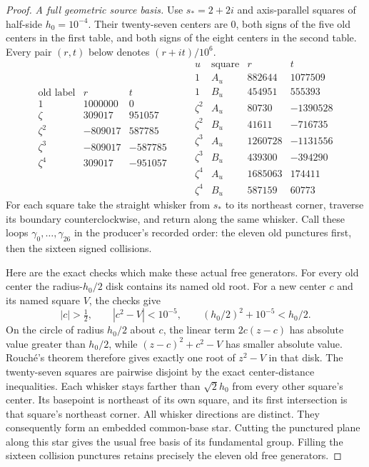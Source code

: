 \begin{proof}
\emph{A full geometric source basis.}
Use $s_*=2+2i$ and axis-parallel squares of half-side
$h_0=10^{-4}$. Their twenty-seven centers are $0$, both signs of
the five old centers in the first table, and both signs of the
eight centers in the second table. Every pair $(r,t)$ below
denotes $(r+it)/10^6$.
\[
 \begin{array}{c|rr}
 \text{old label}&r&t\\\hline
 1&1000000&0\\
 \zeta&309017&951057\\
 \zeta^2&-809017&587785\\
 \zeta^3&-809017&-587785\\
 \zeta^4&309017&-951057
 \end{array}
 \qquad
 \begin{array}{cc|rr}
 u&\text{square}&r&t\\\hline
 1&A_u&882644&1077509\\
 1&B_u&454951&555393\\
 \zeta^2&A_u&80730&-1390528\\
 \zeta^2&B_u&41611&-716735\\
 \zeta^3&A_u&1260728&-1131556\\
 \zeta^3&B_u&439300&-394290\\
 \zeta^4&A_u&1685063&174411\\
 \zeta^4&B_u&587159&60773
 \end{array}                                                  \tag{F.23.14}
\]
For each square take the straight whisker from $s_*$ to its
northeast corner, traverse its boundary counterclockwise, and
return along the same whisker. Call these loops $\gamma_0,\ldots,
\gamma_{26}$ in the producer's recorded order: the eleven old
punctures first, then the sixteen signed collisions.

Here are the exact checks which make these actual free generators.
For every old center the radius-$h_0/2$ disk contains its named
old root. For a new center $c$ and its named square $V$, the checks give
\[
 |c|>\tfrac12,\qquad |c^2-V|<10^{-5},\qquad
 (h_0/2)^2+10^{-5}<h_0/2.                                    \tag{F.23.15}
\]
On the circle of radius $h_0/2$ about $c$, the linear term
$2c(z-c)$ has absolute value greater than $h_0/2$, while
$(z-c)^2+c^2-V$ has smaller absolute value. Rouch\'e's theorem
therefore gives exactly one root of $z^2-V$ in that disk.
The twenty-seven squares are pairwise disjoint by the exact
center-distance inequalities. Each whisker stays farther than
$\sqrt2h_0$ from every other square's center. Its basepoint is
northeast of its own square, and its first intersection is that
square's northeast corner. All whisker directions are distinct.
They consequently form an embedded common-base star. Cutting
the punctured plane along this star gives the usual free basis
of its fundamental group. Filling the sixteen collision punctures
retains precisely the eleven old free generators.


\end{proof}
